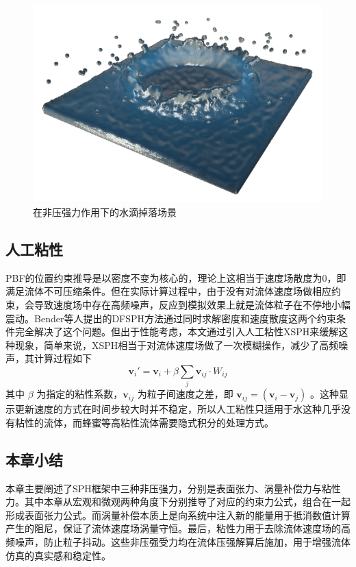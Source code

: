     \begin{figure}[htbp]
    	\centering
    	\includegraphics[width=.7\textwidth]{figures/simulation/drop.png}
    	\caption{在非压强力作用下的水滴掉落场景}
    \end{figure}

\subsection{人工粘性}
    PBF的位置约束推导是以密度不变为核心的，理论上这相当于速度场散度为0，即满足流体不可压缩条件。但在实际计算过程中，由于没有对流体速度场做相应约束，会导致速度场中存在高频噪声，反应到模拟效果上就是流体粒子在不停地小幅震动。Bender等人提出的DFSPH\cite{BK15DFSPH}方法通过同时求解密度和速度散度这两个约束条件完全解决了这个问题。但出于性能考虑，本文通过引入人工粘性XSPH\cite{SB2012XSPH}来缓解这种现象，简单来说，XSPH相当于对流体速度场做了一次模糊操作，减少了高频噪声，其计算过程如下
    \begin{equation}
    	\mathbf v_i' = \mathbf v_i + \beta \sum_j \mathbf v_{ij} \cdot W_{ij}
    \end{equation}
    其中 $\beta$ 为指定的粘性系数，$\mathbf v_{ij}$ 为粒子间速度之差，即 $\mathbf v_{ij} = (\mathbf v_i - \mathbf v_j)$ 。这种显示更新速度的方式在时间步较大时并不稳定，所以人工粘性只适用于水这种几乎没有粘性的流体，而蜂蜜等高粘性流体需要隐式积分的处理方式。

\subsection{本章小结}
    本章主要阐述了SPH框架中三种非压强力，分别是表面张力、涡量补偿力与粘性力。其中本章从宏观和微观两种角度下分别推导了对应的约束力公式，组合在一起形成表面张力公式。而涡量补偿本质上是向系统中注入新的能量用于抵消数值计算产生的阻尼，保证了流体速度场涡量守恒。最后，粘性力用于去除流体速度场的高频噪声，防止粒子抖动。这些非压强受力均在流体压强解算后施加，用于增强流体仿真的真实感和稳定性。